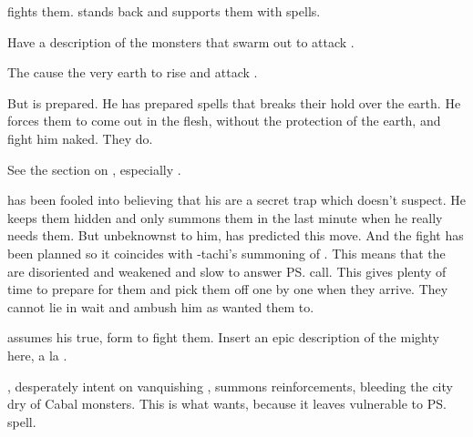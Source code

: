\Ishnaruchaefir{} fights them. 
\Teshrial{} stands back and supports them with spells. 

Have a description of the monsters that swarm out to attack \Ishnaruchaefir. 

The \noggyaleth cause the very earth to rise and attack \Ishnaruchaefir.


But \Ishnaruchaefir is prepared. 
He has prepared spells that breaks their hold over the earth. 
He forces them to come out in the flesh, without the protection of the earth, and fight him naked. 
They do. 

See the section on , especially .

\Teshrial{} has been fooled into believing that his \noggyaleth{} are a secret trap which \Ishnaruchaefir{} doesn't suspect. 
He keeps them hidden and only summons them in the last minute when he really needs them. 
But unbeknownst to him, \Ishnaruchaefir{} has predicted this move. 
And the fight has been planned so it coincides with \Psyrex-tachi's summoning of \Nithdornazsh. 
This means that the \noggyaleth{} are disoriented and weakened and slow to answer \ps{\Teshrial} call. 
This gives \Ishnaruchaefir{} plenty of time to prepare for them and pick them off one by one when they arrive. 
They cannot lie in wait and ambush him as \Teshrial{} wanted them to. 

\Ishnaruchaefir{} assumes his true, \draconian{} form to fight them. 
Insert an epic description of the mighty \dragon{} here, a la . 

\Teshrial{}, desperately intent on vanquishing \Ishnaruchaefir{}, summons reinforcements, bleeding the city dry of Cabal monsters. 
This is what \Ishnaruchaefir{} wants, because it leaves \Malcur vulnerable to \ps{\Psyrex}{} spell. 

